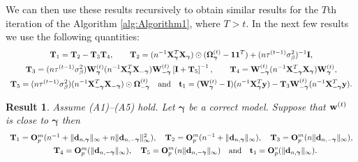\documentclass[11pt]{article}
\newtheorem{Result}{Result}
\newtheorem{Main Result}{Main Result}
\def\vectorfontone{\bf}
\def\vectorfonttwo{\boldsymbol}
\def\vd{{\vectorfontone d}}                      %
\def\vt{{\vectorfontone t}}                      %
\def\vw{{\vectorfontone w}}                      %
\def\vy{{\vectorfontone y}}                      %
\def\vone{{\vectorfontone 1}}
\def\vgamma{{\vectorfonttwo \gamma}}             %
\def\matrixfontone{\bf}
\def\matrixfonttwo{\boldsymbol}
\def\mI{{\matrixfontone I}}                      %
\def\mO{{\matrixfontone O}}                      %
\def\mT{{\matrixfontone T}}                      %
\def\mW{{\matrixfontone W}}                      %
\def\mX{{\matrixfontone X}}                      %
\def\mOmega{{\matrixfonttwo \Omega}}             %
\def\ds{\displaystyle}
\newcommand{\cyc}[1]{{\color{black}#1}}
\begin{document}
\noindent We can then use these results recursively to obtain similar
results for the $T$th iteration of the Algorithm \ref{alg:Algorithm1}, where $T>t$.
In the next few results we use the following quantities:
\begin{equation}\label{eq:Tdefinitions}
\begin{array}{c}
\ds \mT_1 = \mT_2  - \mT_3\mT_4,
\qquad
\ds \mT_2 = (n^{-1}\mX_{\vgamma}^T\mX_{\vgamma}) \odot(\mOmega_{\vgamma}^{(t)} - \vone\vone^T) + (n\tau^{\cyc{(t-1)}}\sigma_\beta^2)^{-1}\mI, \\ [1ex]
\ds \mT_3 = (n\tau^{\cyc{(t-1)}}\sigma^2_\beta)\mW_{\vgamma}^{(t)}(n^{-1}\mX_{\vgamma}^T\mX_{-\vgamma})\mW_{-\vgamma}^{(t)}\left[ \mI + \mT_5 \right]^{-1},
\qquad
\ds \mT_4 = \mW_{-\vgamma}^{(t)}(n^{-1}\mX_{-\vgamma}^T\mX_{\vgamma}) \mW_{\vgamma}^{(t)}, \\ [1ex]
\ds \mT_5 = (n\tau^{\cyc{(t-1)}}\sigma^2_\beta)(n^{-1}\mX_{-\vgamma}^T\mX_{-\vgamma})\odot\mOmega_{-\vgamma}^{(t)}
\quad
\mbox{and}\quad
\ds \vt_1 = (\mW_{\vgamma}^{(t)} - \mI)(n^{-1}\mX_{\vgamma}^T\vy)
- \mT_3\mW_{-\vgamma}^{(t)}(n^{-1}\mX_{-\vgamma}^T\vy).
\end{array}
\end{equation}

\begin{Result}\label{res:7}
	Assume (A1)--(A5) hold. Let $\vgamma$ be a correct model. Suppose that
	$\vw^{(t)}$ is close to $\vgamma$ then
	$$
	\begin{array}{c}
	\mT_1 = \mO_p^m(n^{-1} + \|\vd_{n,\vgamma}\|_\infty + n\|\vd_{n,-\vgamma}\|_\infty^2 ),
	\quad
	\ds \mT_2= \mO_p^m( n^{-1} + \|\vd_{n,\vgamma}\|_\infty ),
	\quad
	\ds \mT_3 = \mO_p^m(n\|\vd_{n,-\vgamma}\|_\infty), \\ [1ex]
	\quad
	\mT_4 =  \mO_p^m(\|\vd_{n,-\vgamma}\|_\infty),
	\quad
	\ds \mT_5 =  \mO_p^m(n\|\vd_{n,-\vgamma}\|_\infty)
	\quad \mbox{and} \quad
	\ds \vt_1 = \mO_p^v(\|\vd_{n,\vgamma}\|_\infty).
	\end{array}
	$$
\end{Result}
\end{document}
